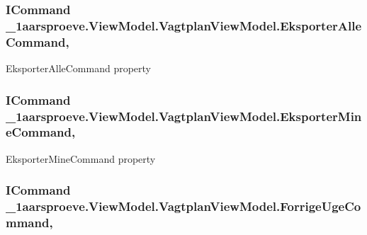 \subsubsection[{Eksporter\+Alle\+Command}]{\setlength{\rightskip}{0pt plus 5cm}I\+Command \+\_\+1aarsproeve.\+View\+Model.\+Vagtplan\+View\+Model.\+Eksporter\+Alle\+Command\hspace{0.3cm}{\ttfamily [get]}, {\ttfamily [set]}}\label{class__1aarsproeve_1_1_view_model_1_1_vagtplan_view_model_aaacfd0f73f0fe5a3784fda8f7fb0c045}


Eksporter\+Alle\+Command property 

\hypertarget{class__1aarsproeve_1_1_view_model_1_1_vagtplan_view_model_a4606860561c41d7330663950515cf369}{}
\subsubsection[{Eksporter\+Mine\+Command}]{\setlength{\rightskip}{0pt plus 5cm}I\+Command \+\_\+1aarsproeve.\+View\+Model.\+Vagtplan\+View\+Model.\+Eksporter\+Mine\+Command\hspace{0.3cm}{\ttfamily [get]}, {\ttfamily [set]}}\label{class__1aarsproeve_1_1_view_model_1_1_vagtplan_view_model_a4606860561c41d7330663950515cf369}


Eksporter\+Mine\+Command property 

\hypertarget{class__1aarsproeve_1_1_view_model_1_1_vagtplan_view_model_a0b3b612ac629f20f80c28bc6560da7a1}{}
\subsubsection[{Forrige\+Uge\+Command}]{\setlength{\rightskip}{0pt plus 5cm}I\+Command \+\_\+1aarsproeve.\+View\+Model.\+Vagtplan\+View\+Model.\+Forrige\+Uge\+Command\hspace{0.3cm}{\ttfamily [get]}, {\ttfamily [set]}}\label{class__1aarsproeve_1_1_view_model_1_1_vagtplan_view_model_a0b3b612ac629f20f80c28bc6560da7a1}


